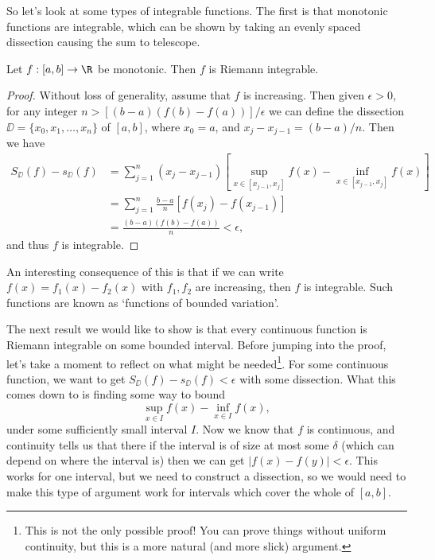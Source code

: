 So let's look at some types of integrable functions. The first is that monotonic functions are integrable, which can be shown by taking an evenly spaced dissection causing the sum to telescope.

\begin{proposition}
	Let $f:[a, b] \rightarrow \R$ be monotonic. Then $f$ is Riemann integrable.
\end{proposition}
\begin{proof}
	Without loss of generality, assume that $f$ is increasing. Then given $\epsilon > 0$, for any integer $n > [(b - a)(f(b)- f(a))]/\epsilon$ we can define the dissection $\DD = \{x_0, x_1, \dots, x_n\}$ of $[a, b]$, where $x_0 = a$, and $x_{j} - x_{j - 1} = (b - a)/n$. Then we have
	\begin{align*}
		S_{\DD}(f) - s_{\DD}(f) &= \sum_{j = 1}^n (x_{j} - x_{j - 1})\left[\sup_{x \in [x_{j - 1}, x_j]} f(x) - \inf_{x \in [x_{j - 1}, x_j]} f(x)\right] \\
&= \sum_{j = 1}^n \frac{b - a}{n}\left[f(x_j) - f(x_{j - 1})\right] \\
&= \frac{(b - a)(f(b) - f(a))}{n} < \epsilon,
	\end{align*}
	and thus $f$ is integrable.
\end{proof}

An interesting consequence of this is that if we can write $f(x) = f_1(x) - f_2(x)$ with $f_1, f_2$ are increasing, then $f$ is integrable. Such functions are known as `functions of bounded variation'. 

The next result we would like to show is that every continuous function is Riemann integrable on some bounded interval. Before jumping into the proof, let's take a moment to reflect on what might be needed\footnote{This is not the only possible proof! You can prove things without uniform continuity, but this is a more natural (and more slick) argument.}. For some continuous function, we want to get $S_{\DD}(f) - s_{\DD}(f) < \epsilon$ with some dissection. What this comes down to is finding some way to bound
$$
\sup_{x \in I}f(x) - \inf_{x \in I} f(x),
$$
under some sufficiently small interval $I$. 
Now we know that $f$ is continuous, and continuity tells us that there if the interval is of size at most some $\delta$ (which can depend on where the interval is) then we can get $|f(x) - f(y)| < \epsilon$. 
This works for one interval, but we need to construct a dissection, so we would need to make this type of argument work for intervals which cover the whole of $[a, b]$.

